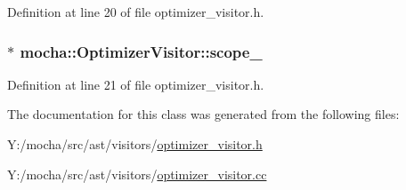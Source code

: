 Definition at line 20 of file optimizer\_\-visitor.h.

\hypertarget{classmocha_1_1_optimizer_visitor_a5d5dc3088bc84c4ca0764533cfa8691e}{
\subsubsection[{scope\_\-}]{$\ast$ {\bf mocha::OptimizerVisitor::scope\_\-}}}
\label{classmocha_1_1_optimizer_visitor_a5d5dc3088bc84c4ca0764533cfa8691e}


Definition at line 21 of file optimizer\_\-visitor.h.



The documentation for this class was generated from the following files:\begin{DoxyCompactItemize}
\item 
Y:/mocha/src/ast/visitors/\hyperlink{optimizer__visitor_8h}{optimizer\_\-visitor.h}\item 
Y:/mocha/src/ast/visitors/\hyperlink{optimizer__visitor_8cc}{optimizer\_\-visitor.cc}\end{DoxyCompactItemize}
